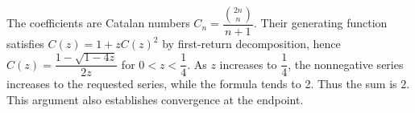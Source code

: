 The coefficients are Catalan numbers $C_n=\dfrac{\binom{2n}n}{n+1}$. Their generating function satisfies $C(z)=1+zC(z)^2$ by first-return decomposition, hence $C(z)=\dfrac{1-\sqrt{1-4z}}{2z}$ for $0<z<\dfrac{1}{4}$. As $z$ increases to $\dfrac{1}{4}$, the nonnegative series increases to the requested series, while the formula tends to 2. Thus the sum is $\boxed2$. This argument also establishes convergence at the endpoint.
